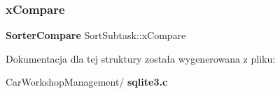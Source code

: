 \mbox{\label{struct_sort_subtask_a42bfd224f9e8125c22c2cc66f865d9af}} 
\subsubsection{xCompare}
{\footnotesize\ttfamily \textbf{ Sorter\+Compare} Sort\+Subtask\+::x\+Compare}



Dokumentacja dla tej struktury została wygenerowana z pliku\+:\begin{DoxyCompactItemize}
\item 
Car\+Workshop\+Management/\textbf{ sqlite3.\+c}\end{DoxyCompactItemize}
